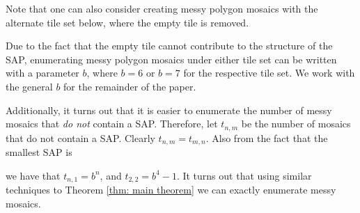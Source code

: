 \documentclass[12pt]{article}
\theoremstyle{plain}
\theoremstyle{definition}
\theoremstyle{remark}
\theoremstyle{definition}
\newcommand{\cellA}[4]{ \draw[thick] ( #1 , #2 ) rectangle ( #3 , #4 ); \draw[red, thick, densely dotted] (#3 * 0.5 + #1 * 0.5 , #2) -- (#3, #4 * 0.5 + #2 * 0.5);}
\newcommand{\cellB}[4]{ \draw[thick] ( #1 , #2 ) rectangle ( #3 , #4 ); \draw[red, thick, densely dotted] (#3 * 0.5 + #1 * 0.5 , #2) -- (#1, #4 * 0.5 + #2 * 0.5);}
\newcommand{\cellC}[4]{ \draw[thick] ( #1 , #2 ) rectangle ( #3 , #4 ); \draw[red, thick, densely dotted] (#3 * 0.5 + #1 * 0.5 , #4) -- (#1, #4 * 0.5 + #2 * 0.5);}
\newcommand{\cellD}[4]{ \draw[thick] ( #1 , #2 ) rectangle ( #3 , #4 ); \draw[red, thick, densely dotted] (#3 * 0.5 + #1 * 0.5 , #4) -- (#3, #4 * 0.5 + #2 * 0.5);}
\newcommand{\cellE}[4]{ \draw[thick] ( #1 , #2 ) rectangle ( #3 , #4 ); \draw[red, thick, densely dotted] (#3 * 0.5 + #1 * 0.5 , #2) -- (#3 * 0.5 + #1 * 0.5 , #4);}
\newcommand{\cellF}[4]{ \draw[thick] ( #1 , #2 ) rectangle ( #3 , #4 ); \draw[red, thick, densely dotted] (#3, #4 * 0.5 + #2 * 0.5) -- (#1, #4 * 0.5 + #2 * 0.5);}
\begin{document}
Note that one can also consider creating messy polygon mosaics with the alternate tile set below, where the empty tile is removed.

\begin{center}
\end{center}

Due to the fact that the empty tile cannot contribute to the structure of the SAP, enumerating messy polygon mosaics under either tile set can be written with a parameter $b$, where $b=6$ or $b=7$ for the respective tile set. We work with the general $b$ for the remainder of the paper.

Additionally, it turns out that it is easier to enumerate the number of messy mosaics that \textit{do not} contain a SAP. Therefore, let $t_{n,m}$ be the number of mosaics that do not contain a SAP. Clearly $t_{n,m}=t_{m,n}.$ Also from the fact that the smallest SAP is

\begin{center}
\end{center}

we have that $t_{n,1}=b^n$, and $t_{2,2} = b^4 - 1$. It turns out that using similar techniques to Theorem \ref{thm: main theorem} we can exactly enumerate messy mosaics. 
\end{document}
